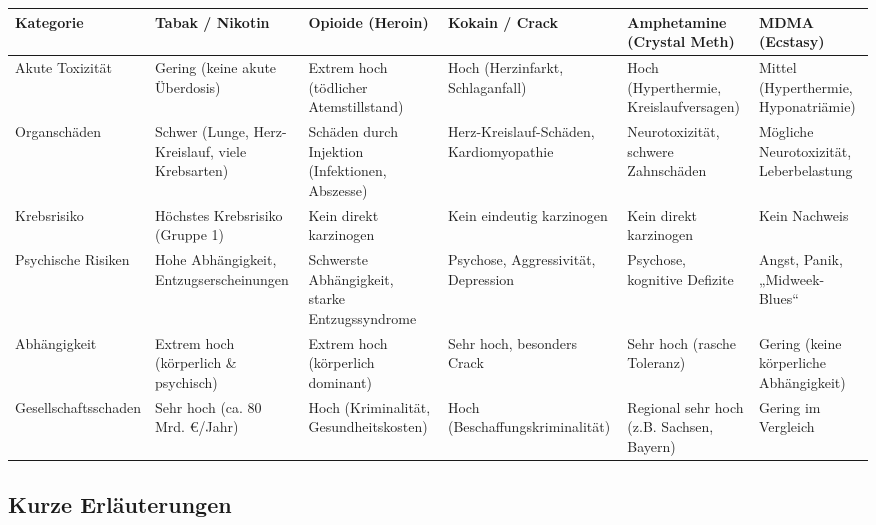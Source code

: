 \documentclass[11pt,a4paper]{article}
\begin{document}
	\begin{table}[h!]
		\centering
		\small
		\renewcommand{\arraystretch}{1.2}
		\begin{tabularx}{\textwidth}{@{} l X X X X X @{}}
			\toprule
			\textbf{Kategorie} & \textbf{Tabak / Nikotin} & \textbf{Opioide (Heroin)} & \textbf{Kokain / Crack} & \textbf{Amphetamine (Crystal Meth)} & \textbf{MDMA (Ecstasy)} \\ 
			\midrule
			Akute Toxizität & Gering (keine akute Überdosis) & Extrem hoch (tödlicher Atemstillstand) & Hoch (Herzinfarkt, Schlaganfall) & Hoch (Hyperthermie, Kreislaufversagen) & Mittel (Hyperthermie, Hyponatriämie) \\
			Organschäden & Schwer (Lunge, Herz-Kreislauf, viele Krebsarten) & Schäden durch Injektion (Infektionen, Abszesse) & Herz-Kreislauf-Schäden, Kardiomyopathie & Neurotoxizität, schwere Zahnschäden & Mögliche Neurotoxizität, Leberbelastung \\
			Krebsrisiko & Höchstes Krebsrisiko (Gruppe 1) & Kein direkt karzinogen & Kein eindeutig karzinogen & Kein direkt karzinogen & Kein Nachweis \\
			Psychische Risiken & Hohe Abhängigkeit, Entzugserscheinungen & Schwerste Abhängigkeit, starke Entzugssyndrome & Psychose, Aggressivität, Depression & Psychose, kognitive Defizite & Angst, Panik, „Midweek-Blues“ \\
			Abhängigkeit & Extrem hoch (körperlich \& psychisch) & Extrem hoch (körperlich dominant) & Sehr hoch, besonders Crack & Sehr hoch (rasche Toleranz) & Gering (keine körperliche Abhängigkeit) \\
			Gesellschaftsschaden & Sehr hoch (ca. 80 Mrd. €/Jahr) & Hoch (Kriminalität, Gesundheitskosten) & Hoch (Beschaffungskriminalität) & Regional sehr hoch (z.B. Sachsen, Bayern) & Gering im Vergleich \\
			\bottomrule
		\end{tabularx}
	\end{table}
	
	\subsection*{Kurze Erläuterungen}
	
\end{document}
